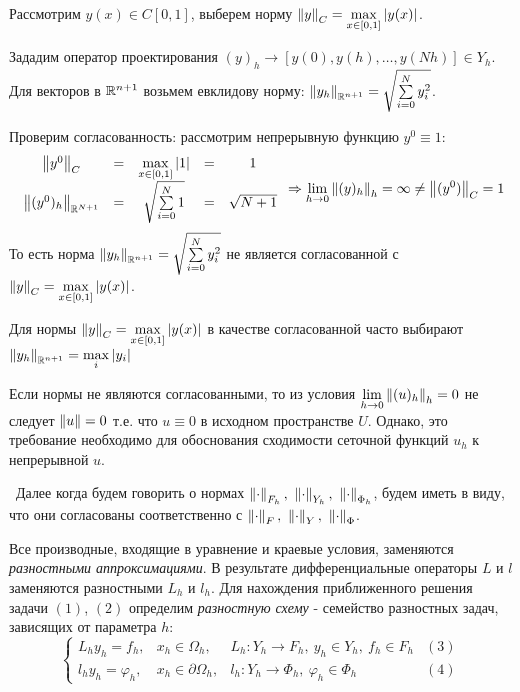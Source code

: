 \begin{example}
  Рассмотрим $y(x)\in C[0,1]$, выберем норму $\left\lVert y\right\rVert_{C}=\max\limits_{x\in[0,1]}|y(x)|$.

  Зададим оператор проектирования $(y)_h\rightarrow[y(0),y(h),\ldots,y(Nh)]\in Y_h$.
  Для векторов в $\mathbb{R}^{n+1}$ возьмем евклидову норму: $\left\lVert y_h\right\rVert_{\mathbb{R}^{n+1}}=\sqrt{\sum\limits_{i=0}^{N}y_i^2}$.

  Проверим согласованность: рассмотрим непрерывную функцию $y^0\equiv1$:
  \[\begin{array}{ccccc}
      \left\lVert y^0\right\rVert_{C}            & = & \max\limits_{x\in[0,1]}\left\lvert1\right\rvert & = & 1          \\
      \left\lVert(y^0)_h\right\rVert_{\mathbb{R}^{N+1}} & = & \sqrt{\sum\limits_{i=0}^{N}1}  & = & \sqrt{N+1}
    \end{array}\Rightarrow \lim\limits_{h\rightarrow0}\left\lVert(y)_h\right\rVert_h=\infty\neq\left\lVert(y^0)\right\rVert_{C}=1\]
  То есть норма $\left\lVert y_h\right\rVert_{\mathbb{R}^{n+1}}=\sqrt{\sum\limits_{i=0}^{N}y_i^2}$ не является
  согласованной с $\left\lVert y\right\rVert_{C}=\max\limits_{x\in[0,1]}|y(x)|$.

  Для нормы $\left\lVert y\right\rVert_{C}=\max\limits_{x\in[0,1]}|y(x)|$ в качестве
  согласованной часто выбирают $\left\lVert y_h\right\rVert_{\mathbb{R}^{n+1}}=\max\limits_{i}|y_i|$
\end{example}

\begin{remark*}
  Если нормы не являются согласованными, то из условия
  $\lim\limits_{h\rightarrow0}\left\lVert(u)_h\right\rVert_h=0$ не следует $\left\lVert u\right\rVert=0$
  т.е. что $u\equiv0$ в исходном пространстве $U$.
  Однако, это требование необходимо для обоснования
  сходимости сеточной функций $u_h$ к непрерывной $u$.
\end{remark*}

\textbullet\ Далее когда будем говорить о нормах $\norm{\cdot}_{F_h},\ \norm{\cdot}_{Y_{h}},\ \norm{\cdot}_{\Phi_h}$, будем иметь
в виду, что они согласованы соответственно с $\norm{\cdot}_{F},\ \norm{\cdot}_{Y},\ \norm{\cdot}_{\Phi}$.

Все производные, входящие в уравнение и краевые условия, заменяются
\textit{разностными аппроксимациями}. В результате дифференциальные
операторы $L$ и $l$ заменяются разностными $L_h$ и $l_h$.
Для нахождения приближенного решения задачи $(1)$, $(2)$
определим \textit{разностную схему} - семейство разностных задач,
зависящих от параметра $h$:
\[\left\{\begin{array}{cccc}
    L_hy_h=f_h,       & x_h\in\Omega_h,          & L_h: Y_h\rightarrow F_h,\ y_h\in Y_h,\ f_h\in F_h & (3) \\
    l_hy_h=\varphi_h, & x_h\in \partial\Omega_h, & l_h: Y_h\rightarrow \Phi_h,\ \varphi_h\in\Phi_h   & (4)
  \end{array}\right.\]

